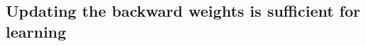 \documentclass[11pt]{article}
\begin{document}


\subsection{Updating the backward weights is sufficient for learning}
\end{document}
